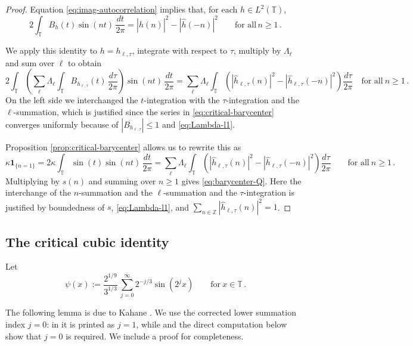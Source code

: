 \documentclass[10pt,a4paper]{amsart}
\newcommand{\T}{\mathbb T}
\newcommand{\Z}{\mathbb Z}
\newcommand{\wh}{\widehat}
\begin{document}
\begin{proof}
    Equation \eqref{eq:imag-autocorrelation} implies that, for each $h\in L^2(\T)$,
    $$
    2 \int_\T B_h(t) \sin(nt)\,\frac{dt}{2\pi} = |\wh h(n)|^2 - |\wh h(-n)|^2 
    \qquad\text{for all}\, n\geq1 \,.
    $$

    We apply this identity to $h=h_{\ell,\tau}$, integrate with respect to $\tau$, multiply by $\Lambda_\ell$ and sum over $\ell$ to obtain
    $$
    2 \int_\T \left( \sum_{\ell} \Lambda_\ell \int_\T B_{h_{\ell,\tau}}(t)\,\frac{d\tau}{2\pi} \right) \sin(nt)\,\frac{dt}{2\pi} = \sum_{\ell} \Lambda_\ell \int_\T \left( |\wh h_{\ell,\tau}(n)|^2 - |\wh h_{\ell,\tau}(-n)|^2 \right)\frac{d\tau}{2\pi}
    \quad\text{for all}\ n\geq 1\,.
    $$
    On the left side we interchanged the $t$-integration with the $\tau$-integration and the $\ell$-summation, which is justified since the series in \eqref{eq:critical-barycenter} converges uniformly because of $|B_{h_{\ell,\tau}}|\leq1$ and \eqref{eq:Lambda-l1}.

    Proposition \ref{prop:critical-barycenter} allows us to rewrite this as
    $$
    \kappa \mathbf 1_{\{n=1\}} = 2\kappa \int_\T \sin(t) \sin(nt)\,\frac{dt}{2\pi}
    = \sum_{\ell} \Lambda_\ell \int_\T \left( |\wh h_{\ell,\tau}(n)|^2 - |\wh h_{\ell,\tau}(-n)|^2 \right)\frac{d\tau}{2\pi}
    \qquad\text{for all}\ n\geq 1    \,.
    $$
    Multiplying by $s(n)$ and summing over $n\geq1$ gives \eqref{eq:barycenter-Q}. Here the interchange of the $n$-summation and the $\ell$-summation and the $\tau$-integration is justified by boundedness of $s$, \eqref{eq:Lambda-l1}, and $\sum_{n\in\Z}|\wh h_{\ell,\tau}(n)|^2=1$.
\end{proof}






\subsection{The critical cubic identity}

Let
\begin{equation}\label{eq:kahane-function}
 \psi(x):= \frac{2^{1/9}}{3^{1/3}} \,\sum_{j=0}^{\infty}2^{-j/3}\sin(2^j x) \qquad\text{for}\ x\in\T \,.
\end{equation}

The following lemma is due to Kahane
\cite{Kahane2005}. We use the corrected lower summation
index $j=0$: in \cite[Eq.~(13)]{Kahane2005} it is printed as $j=1$, while
\cite[Eq.~(17)]{Kahane2005} and the direct computation below show that
$j=0$ is required. We include a proof for completeness.
\end{document}

